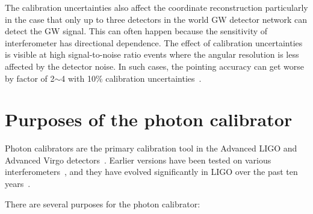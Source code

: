 The calibration uncertainties also affect the coordinate reconstruction 
particularly in the case that only up to three detectors in the world 
GW detector network can detect the GW signal. This can often happen 
because the sensitivity of interferometer has directional dependence. 
The effect of calibration uncertainties is visible at high signal-to-noise 
ratio events where the angular resolution is less affected by the detector 
noise. In such cases, the pointing accuracy can get worse by factor of 
2$\sim$4 with 10\% calibration uncertainties~\cite{Klimenko}.


\section{Purposes of the photon calibrator}

Photon calibrators are the primary calibration tool in the Advanced LIGO 
and Advanced Virgo detectors~\cite{LIGO-CAL,Karki}. Earlier versions have 
been tested on various interferometers~\cite{Virgo-PCAL},
and they have evolved significantly in LIGO over the past ten 
years~\cite{Accadia,Clubley:2001,Mossavi:2006}.

There are several purposes for the photon calibrator:


